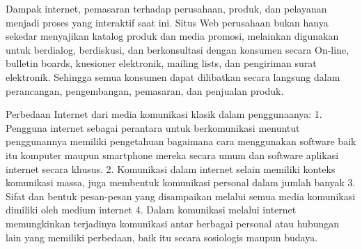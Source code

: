 \documentclass[12pt, a4paper]{article}
\begin{document}
Dampak internet, pemasaran terhadap perusahaan, produk, dan pelayanan menjadi proses yang interaktif saat ini. Situs Web perusahaan bukan hanya sekedar menyajikan katalog produk dan media promosi, melainkan digunakan untuk berdialog, berdiskusi, dan berkonsultasi dengan konsumen secara On-line, bulletin boards, kuesioner elektronik, mailing lists, dan pengiriman surat elektronik. Sehingga semua konsumen dapat dilibatkan secara langsung dalam perancangan, pengembangan, pemasaran, dan penjualan produk.

Perbedaan Internet dari media komunikasi klasik dalam penggunaanya:
1.	Pengguna internet sebagai perantara untuk berkomunikasi menuntut penggunannya memiliki pengetahuan bagaimana cara menggunakan software baik itu komputer maupun smartphone mereka secara umum dan software aplikasi internet secara khusus.
2.	Komunikasi dalam internet selain memiliki konteks komunikasi massa, juga membentuk komunikasi personal dalam jumlah banyak
3.	Sifat dan bentuk pesan-pesan yang disampaikan melalui semua media komunikasi dimiliki oleh medium internet
4.	Dalam komunikasi melalui internet memungkinkan terjadinya komunikasi antar berbagai personal atau hubungan lain yang memiliki perbedaan, baik itu secara sosiologis maupun budaya.
\end{document}
